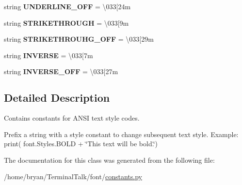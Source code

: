 \begin{DoxyCompactItemize}
\item 
string {\bfseries U\+N\+D\+E\+R\+L\+I\+N\+E\+\_\+\+O\+FF} = \textquotesingle{}\textbackslash{}033\mbox{[}24m\textquotesingle{}\hypertarget{classfont_1_1constants_1_1Styles_a5fabd3fadc86822d9a401c4bec80a966}{}\label{classfont_1_1constants_1_1Styles_a5fabd3fadc86822d9a401c4bec80a966}

\item 
string {\bfseries S\+T\+R\+I\+K\+E\+T\+H\+R\+O\+U\+GH} = \textquotesingle{}\textbackslash{}033\mbox{[}9m\textquotesingle{}\hypertarget{classfont_1_1constants_1_1Styles_a49438d7dd8b4e9de783717b6d4812025}{}\label{classfont_1_1constants_1_1Styles_a49438d7dd8b4e9de783717b6d4812025}

\item 
string {\bfseries S\+T\+R\+I\+K\+E\+T\+H\+R\+O\+U\+H\+G\+\_\+\+O\+FF} = \textquotesingle{}\textbackslash{}033\mbox{[}29m\textquotesingle{}\hypertarget{classfont_1_1constants_1_1Styles_a5406984ee410e185cd36701be2c7c64c}{}\label{classfont_1_1constants_1_1Styles_a5406984ee410e185cd36701be2c7c64c}

\item 
string {\bfseries I\+N\+V\+E\+R\+SE} = \textquotesingle{}\textbackslash{}033\mbox{[}7m\textquotesingle{}\hypertarget{classfont_1_1constants_1_1Styles_a616d45cb55b02a8503229fca77dad35a}{}\label{classfont_1_1constants_1_1Styles_a616d45cb55b02a8503229fca77dad35a}

\item 
string {\bfseries I\+N\+V\+E\+R\+S\+E\+\_\+\+O\+FF} = \textquotesingle{}\textbackslash{}033\mbox{[}27m\textquotesingle{}\hypertarget{classfont_1_1constants_1_1Styles_ab3b2d4eedd8b2a3a437689de4c4262fc}{}\label{classfont_1_1constants_1_1Styles_ab3b2d4eedd8b2a3a437689de4c4262fc}

\end{DoxyCompactItemize}


\subsection{Detailed Description}
Contains constants for A\+N\+SI text style codes. 

Prefix a string with a style constant to change subsequent text style. Example\+: print( font.\+Styles.\+B\+O\+LD + \char`\"{}\+This text will be bold.\char`\"{}) 

The documentation for this class was generated from the following file\+:\begin{DoxyCompactItemize}
\item 
/home/bryan/\+Terminal\+Talk/font/\hyperlink{constants_8py}{constants.\+py}\end{DoxyCompactItemize}
